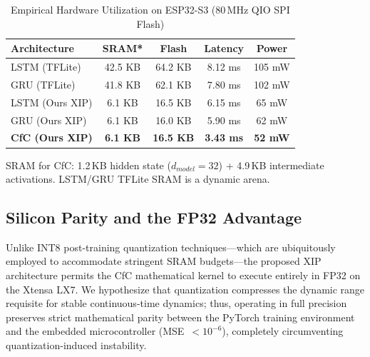 \documentclass[conference]{IEEEtran}
\begin{document}
\begin{table}[t]
\centering
\caption{Empirical Hardware Utilization on ESP32-S3 (80\,MHz QIO SPI Flash)}
\label{tab:hw}
\begin{tabular}{@{}lcccc@{}}
\hline
\textbf{Architecture} & \textbf{SRAM*} & \textbf{Flash} & \textbf{Latency} & \textbf{Power} \\
\hline
LSTM (TFLite) & 42.5 KB & 64.2 KB & 8.12 ms & 105 mW \\
GRU (TFLite) & 41.8 KB & 62.1 KB & 7.80 ms & 102 mW \\
LSTM (Ours XIP) & 6.1 KB & 16.5 KB & 6.15 ms & 65 mW \\
GRU (Ours XIP) & 6.1 KB & 16.0 KB & 5.90 ms & 62 mW \\
\textbf{CfC (Ours XIP)} & \textbf{6.1 KB} & \textbf{16.5 KB} & \textbf{3.43 ms} & \textbf{52 mW} \\
\hline
\end{tabular}
\vspace{3pt}

{\footnotesize *SRAM for CfC: 1.2\,KB hidden state ($d_{model}=32$) + 4.9\,KB intermediate activations. LSTM/GRU TFLite SRAM is a dynamic arena.\par}
\end{table}

\subsection{Silicon Parity and the FP32 Advantage}
Unlike INT8 post-training quantization techniques---which are ubiquitously employed to accommodate stringent SRAM budgets---the proposed XIP architecture permits the CfC mathematical kernel to execute entirely in FP32 on the Xtensa LX7. We hypothesize that quantization compresses the dynamic range requisite for stable continuous-time dynamics; thus, operating in full precision preserves strict mathematical parity between the PyTorch training environment and the embedded microcontroller (MSE~$<10^{-6}$), completely circumventing quantization-induced instability.
\end{document}
